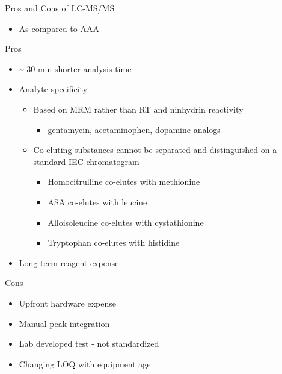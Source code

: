 \documentclass[presentation, smaller]{beamer}
\begin{document}
\begin{frame}[label={sec:orgheadline29}]{Pros and Cons of LC-MS/MS}
\begin{itemize}
\item As compared to AAA
\end{itemize}
\begin{block}{Pros}
\begin{itemize}
\item \textasciitilde{} 30 min shorter analysis time
\item Analyte specificity
\begin{itemize}
\item Based on MRM rather than RT and ninhydrin reactivity
\begin{itemize}
\item gentamycin, acetaminophen, dopamine analogs
\end{itemize}
\item Co-eluting substances cannot be separated and distinguished on a
standard IEC chromatogram
\begin{itemize}
\item Homocitrulline co-elutes with methionine
\item ASA co-elutes with leucine
\item Alloisoleucine co-elutes with cystathionine
\item Tryptophan co-elutes with histidine
\end{itemize}
\end{itemize}
\item Long term reagent expense
\end{itemize}
\end{block}

\begin{block}{Cons}
\begin{itemize}
\item Upfront hardware expense
\item Manual peak integration
\item Lab developed test - not standardized
\item Changing LOQ with equipment age
\end{itemize}
\end{block}
\end{frame}
\end{document}
